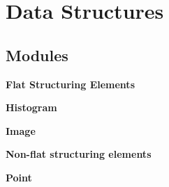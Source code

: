 \section{Data Structures}
\label{group__DataStructures}
\subsection*{Modules}
\begin{CompactItemize}
\item 
{\bf Flat Structuring Elements}
\item 
{\bf Histogram}
\item 
{\bf Image}
\item 
{\bf Non-flat structuring elements}
\item 
{\bf Point}
\end{CompactItemize}
